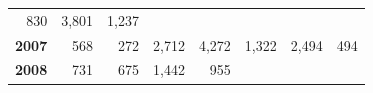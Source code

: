 \documentclass[]{article}
\begin{document}
\begin{longtable}[]{@{}rrrrrrrr@{}}
\begin{minipage}[t]{0.09\columnwidth}
830\strut
\end{minipage} & \begin{minipage}[t]{0.08\columnwidth}\raggedleft\strut
3,801\strut
\end{minipage} & \begin{minipage}[t]{0.10\columnwidth}\raggedleft\strut
1,237\strut
\end{minipage}\tabularnewline
\begin{minipage}[t]{0.08\columnwidth}\raggedleft\strut
\textbf{2007}\strut
\end{minipage} & \begin{minipage}[t]{0.10\columnwidth}\raggedleft\strut
568\strut
\end{minipage} & \begin{minipage}[t]{0.11\columnwidth}\raggedleft\strut
272\strut
\end{minipage} & \begin{minipage}[t]{0.08\columnwidth}\raggedleft\strut
2,712\strut
\end{minipage} & \begin{minipage}[t]{0.14\columnwidth}\raggedleft\strut
4,272\strut
\end{minipage} & \begin{minipage}[t]{0.09\columnwidth}\raggedleft\strut
1,322\strut
\end{minipage} & \begin{minipage}[t]{0.08\columnwidth}\raggedleft\strut
2,494\strut
\end{minipage} & \begin{minipage}[t]{0.10\columnwidth}\raggedleft\strut
494\strut
\end{minipage}\tabularnewline
\begin{minipage}[t]{0.08\columnwidth}\raggedleft\strut
\textbf{2008}\strut
\end{minipage} & \begin{minipage}[t]{0.10\columnwidth}\raggedleft\strut
731\strut
\end{minipage} & \begin{minipage}[t]{0.11\columnwidth}\raggedleft\strut
675\strut
\end{minipage} & \begin{minipage}[t]{0.08\columnwidth}\raggedleft\strut
1,442\strut
\end{minipage} & \begin{minipage}[t]{0.14\columnwidth}\raggedleft\strut
955\strut
\end{minipage} & \begin{minipage}[t]{0.09\columnwidth}\raggedleft\strut

\end{minipage}
\end{longtable}
\end{document}

